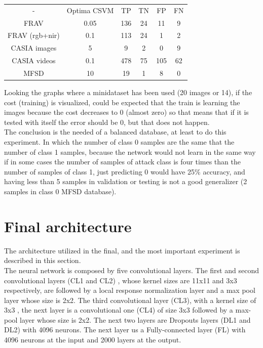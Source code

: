 \begin{table}[htb]
\centering
\label{table-ej1}
\begin{tabular}{cccccc}
-              &Optima CSVM& TP & TN & FP & FN \\
FRAV           &    0.05   & 136& 24 &  11 & 9 \\
FRAV (rgb+nir) &    0.1    & 113& 24 &  1  & 2 \\
CASIA images   &    5      & 9  & 2  &  0  & 9 \\
CASIA videos   &    0.1    & 478& 75 &  105& 62 \\
MFSD           &    10     & 19 &  1 &   8 & 0 \\
\end{tabular}
\end{table}

Looking the graphs where a minidataset has been used (20 images or 14), if the cost (training) is visualized, could be expected that the train is learning the images because the cost decreases to 0 (almost zero) so that means that if it is tested with itself the error should be 0, but that does not happen.\\

The conclusion is the needed of a balanced database, at least to do this experiment. In which the number of class 0 samples are the same that the number of class 1 samples, because the network would not learn in the same way if in some cases the number of samples of  attack class is four times than the number of samples of class 1, just predicting 0 would have 25\% accuracy, and having less than 5 samples in validation or testing is not a good generalizer (2 samples in class 0 MFSD database).\\

\section{Final architecture} %
The architecture utilized in the final, and the most important experiment is described in this section.\\

The neural network is composed by five convolutional layers. The first and second convolutional layers (CL1 and CL2) , whose kernel sizes are 11x11 and 3x3 respectively, are followed by a local response normalization layer and a max pool layer whose size is 2x2. The third convolutional layer (CL3), with a kernel size of 3x3 , the next layer is a convolutional one (CL4) of size 3x3 followed by a max-pool layer whose size is 2x2. The next two layers are Dropouts layers (DL1 and DL2) with 4096 neurons. The next layer us a Fully-connected layer (FL) with 4096 neurons at the input and 2000 layers at the output.\\

